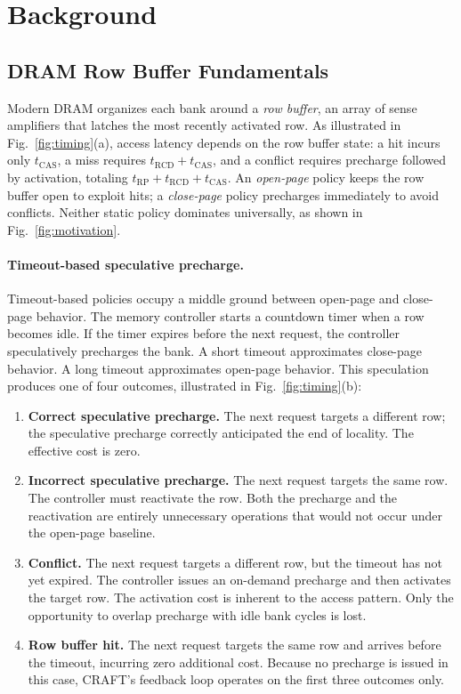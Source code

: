 \documentclass[runningheads]{llncs}
\begin{document}
\section{Background}
\label{sec:background}

\subsection{DRAM Row Buffer Fundamentals}

Modern DRAM organizes each bank around a \emph{row buffer}, an array of sense amplifiers that latches the most recently activated row. As illustrated in Fig.~\ref{fig:timing}(a), access latency depends on the row buffer state: a hit incurs only $t_\mathrm{CAS}$, a miss requires $t_\mathrm{RCD} + t_\mathrm{CAS}$, and a conflict requires precharge followed by activation, totaling $t_\mathrm{RP} + t_\mathrm{RCD} + t_\mathrm{CAS}$. An \emph{open-page} policy keeps the row buffer open to exploit hits; a \emph{close-page} policy precharges immediately to avoid conflicts. Neither static policy dominates universally, as shown in Fig.~\ref{fig:motivation}.

\paragraph{Timeout-based speculative precharge.}
Timeout-based policies occupy a middle ground between open-page and close-page behavior. The memory controller starts a countdown timer when a row becomes idle. If the timer expires before the next request, the controller speculatively precharges the bank. A short timeout approximates close-page behavior. A long timeout approximates open-page behavior. This speculation produces one of four outcomes, illustrated in Fig.~\ref{fig:timing}(b):

\begin{enumerate}
\item \textbf{Correct speculative precharge.} The next request targets a different row; the speculative precharge correctly anticipated the end of locality. The effective cost is zero.
\item \textbf{Incorrect speculative precharge.} The next request targets the same row. The controller must reactivate the row. Both the precharge and the reactivation are entirely unnecessary operations that would not occur under the open-page baseline.
\item \textbf{Conflict.} The next request targets a different row, but the timeout has not yet expired. The controller issues an on-demand precharge and then activates the target row. The activation cost is inherent to the access pattern. Only the opportunity to overlap precharge with idle bank cycles is lost.
\item \textbf{Row buffer hit.} The next request targets the same row and arrives before the timeout, incurring zero additional cost. Because no precharge is issued in this case, CRAFT's feedback loop operates on the first three outcomes only.
\end{enumerate}
\end{document}
